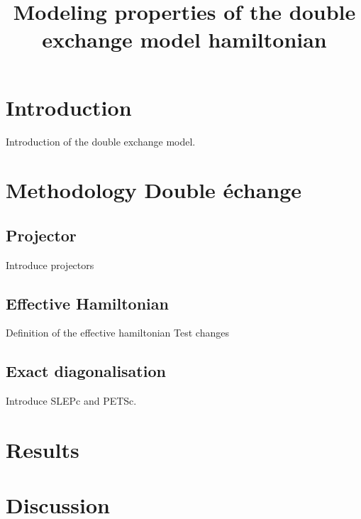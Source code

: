 \documentclass[ openright,titlepage,numbers=noenddot,headinclude,twoside,%
                footinclude=true,cleardoublepage=empty,abstractoff,%
                BCOR=5mm,paper=a4,fontsize=11pt,%
                ngerman,american,%
]{scrreprt}
\title{Modeling properties of the double exchange model hamiltonian}
\begin{document}
\maketitle
\thispagestyle{fancy}
\section{Introduction}

Introduction of the double exchange model.

\section{Methodology Double échange}

\subsection{Projector}

Introduce projectors

\subsection{Effective Hamiltonian}

Definition of the effective hamiltonian
Test changes

\subsection{Exact diagonalisation}

Introduce SLEPc and PETSc.

\section{Results}
\section{Discussion}
\end{document}
